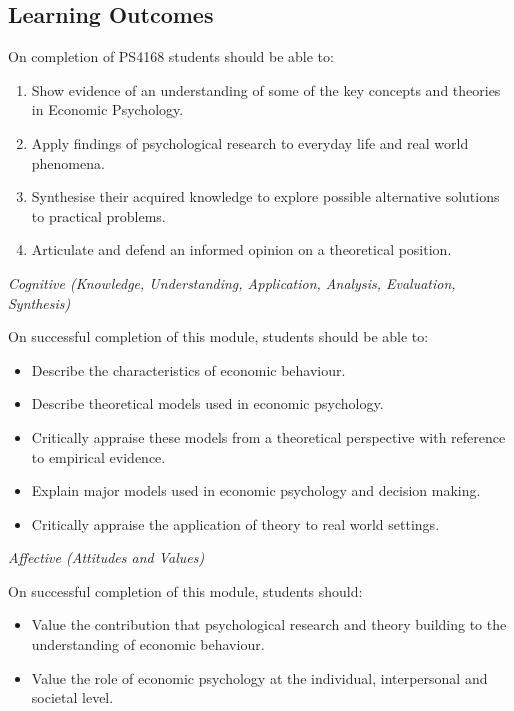 \documentclass[
  x11names]{article}
\providecommand{\tightlist}{%
  \setlength{\itemsep}{0pt}\setlength{\parskip}{0pt}}
\begin{document}
\subsection{Learning Outcomes}\label{learning-outcomes}

On completion of PS4168 students should be able to:

\begin{enumerate}
\def\labelenumi{\arabic{enumi}.}
\item
  Show evidence of an understanding of some of the key concepts and
  theories in Economic Psychology.
\item
  Apply findings of psychological research to everyday life and real
  world phenomena.
\item
  Synthesise their acquired knowledge to explore possible alternative
  solutions to practical problems.
\item
  Articulate and defend an informed opinion on a theoretical position.
\end{enumerate}

\bigskip

\emph{Cognitive (Knowledge, Understanding, Application, Analysis,
Evaluation, Synthesis)}

On successful completion of this module, students should be able to:

\begin{itemize}
\tightlist
\item
  Describe the characteristics of economic behaviour.
\item
  Describe theoretical models used in economic psychology.
\item
  Critically appraise these models from a theoretical perspective with
  reference to empirical evidence.
\item
  Explain major models used in economic psychology and decision making.
\item
  Critically appraise the application of theory to real world settings.
\end{itemize}

\bigskip

\emph{Affective (Attitudes and Values)}

On successful completion of this module, students should:

\begin{itemize}
\tightlist
\item
  Value the contribution that psychological research and theory building
  to the understanding of economic behaviour.
\item
  Value the role of economic psychology at the individual, interpersonal
  and societal level.
\end{itemize}
\end{document}
